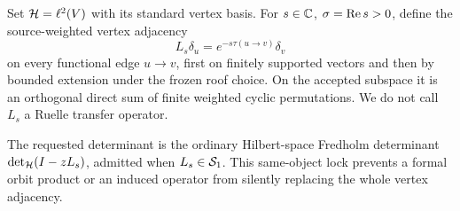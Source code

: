 Set $\mathcal{H}=\ell^2(V)$ with its standard vertex basis.  For
$s\in\mathbb{C}$, $\sigma=\operatorname{Re} s>0$, define the source-weighted vertex adjacency
\begin{equation}
L_s\delta_u=e^{-s\tau(u\to v)}\delta_v
\label{eq:vertex-adjacency}
\end{equation}
on every functional edge $u\to v$, first on finitely supported vectors and
then by bounded extension under the frozen roof choice.  On the accepted
subspace it is an orthogonal direct sum of finite weighted cyclic
permutations.  We do not call
$L_s$ a Ruelle transfer operator.

The requested determinant is the ordinary Hilbert-space Fredholm determinant
$\det_{\mathcal{H}}(I-zL_s)$, admitted when $L_s\in\mathcal{S}_1$.  This same-object lock
prevents a formal orbit product or an induced operator from silently replacing
the whole vertex adjacency.

